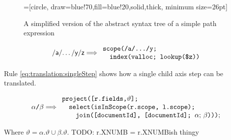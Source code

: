 \begin{figure}[h]
\centering
{}=[circle, draw=blue!70,fill=blue!20,solid,thick, minimum
size=26pt]
\label{fig:translation:pathAST}
\caption[AST of path expression]{A simplified version of the abstract syntax
tree of a simple path expression}
\end{figure}


\begin{equation}
\centering
\textsf{/a/\ldots/y/z}
\Longrightarrow
\begin{array}{l}
	\mbox{\texttt{scope(/a/\ldots/y;}} \\
	\quad \mbox{\texttt{index(valloc; lookup(\$z))}}
\end{array}
\label{eq:translation:pathExpr}
\end{equation}

Rule \ref{eq:translation:singleStep} shows how a single child axis step can be
translated.

\begin{equation}
\centering
\alpha \texttt{/} \beta
\Longrightarrow
\begin{array}{l}
	\mbox{\texttt{project([r.fields,}} \vartheta \mbox{\texttt{];}} \\ \quad
 	\mbox{\texttt{select(isInScope(r.scope, l.scope);}} \\ \quad \quad
 	\mbox{\texttt{join([documentId], [documentId]; }} 
 	\alpha;\, \beta \mbox{\texttt{)))}}; \\
\end{array}
\label{eq:translation:singleStep}
\end{equation}

Where $\vartheta = \alpha.\vartheta \cup \beta.\vartheta$. TODO: r.XNUMB =
r.XNUMBish thingy

